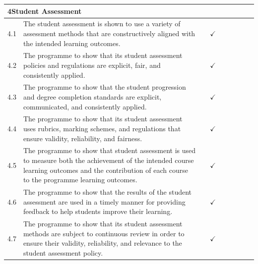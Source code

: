 \begin{longtable}{|p{0.6cm}|>{\raggedright\arraybackslash}p{9.2cm}|c|c|c|c|c|c|c|}
  \multicolumn{9}{|l|}{\cellcolor{gray!15}\textbf{4\quad Student Assessment}} \\
  \hline
  4.1 & The student assessment is shown to use a variety of assessment methods that are constructively aligned with the intended learning outcomes. & & $\checkmark$ & & & & & \\
  \hline
  4.2 & The programme to show that its student assessment policies and regulations are explicit, fair, and consistently applied. & & $\checkmark$ & & & & & \\
  \hline
  4.3 & The programme to show that the student progression and degree completion standards are explicit, communicated, and consistently applied. & & $\checkmark$ & & & & & \\
  \hline
  4.4 & The programme to show that its student assessment uses rubrics, marking schemes, and regulations that ensure validity, reliability, and fairness. & & $\checkmark$ & & & & & \\
  \hline
  4.5 & The programme to show that student assessment is used to measure both the achievement of the intended course learning outcomes and the contribution of each course to the programme learning outcomes. & & $\checkmark$ & & & & & \\
  \hline
  4.6 & The programme to show that the results of the student assessment are used in a timely manner for providing feedback to help students improve their learning. & & $\checkmark$ & & & & & \\
  \hline
  4.7 & The programme to show that its student assessment methods are subject to continuous review in order to ensure their validity, reliability, and relevance to the student assessment policy. & & $\checkmark$ & & & & & \\
  \hline


\end{longtable}
